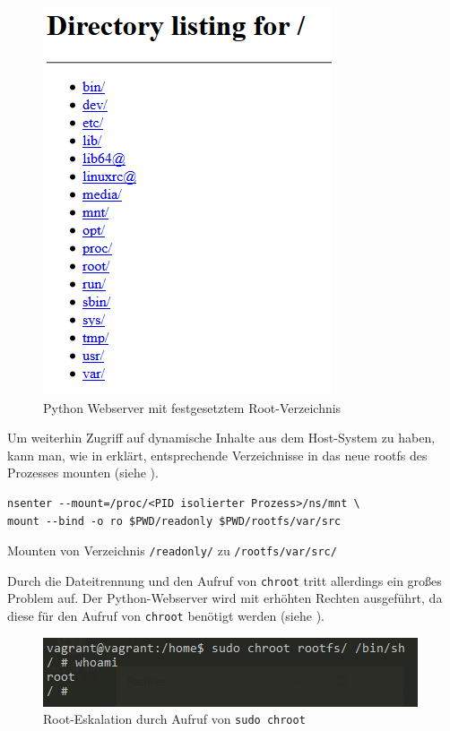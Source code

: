 \begin{figure}[H]
	\begin{center}
		\includegraphics[scale=0.7]{bilder/chroot-python-webserver.png}
		\caption{Python Webserver mit festgesetztem Root-Verzeichnis}
		\label{fig:chrootPythonWebserver}
	\end{center}
\end{figure}

Um weiterhin Zugriff auf dynamische Inhalte aus dem Host-System zu haben, kann man, wie in  erklärt, entsprechende Verzeichnisse in das neue rootfs des Prozesses mounten (siehe ).

\begin{listing}[h]
	\begin{verbatim}
nsenter --mount=/proc/<PID isolierter Prozess>/ns/mnt \
mount --bind -o ro $PWD/readonly $PWD/rootfs/var/src
	\end{verbatim}
	\caption{Mounten von Verzeichnis \texttt{/readonly/} zu \texttt{/rootfs/var/src/}}
	\label{lst:mountReadOnly}
\end{listing}

Durch die Dateitrennung und den Aufruf von \texttt{chroot} tritt allerdings ein großes Problem auf. Der Python-Webserver wird mit erhöhten Rechten ausgeführt, da diese für den Aufruf von \texttt{chroot} benötigt werden (siehe ).

\begin{figure}[h]
	\begin{center}
		\includegraphics[scale=1]{bilder/chroot-whoami-root.png}
		\caption{Root-Eskalation durch Aufruf von \texttt{sudo chroot}}
		\label{fig:chrootWhoami}
	\end{center}
\end{figure}

